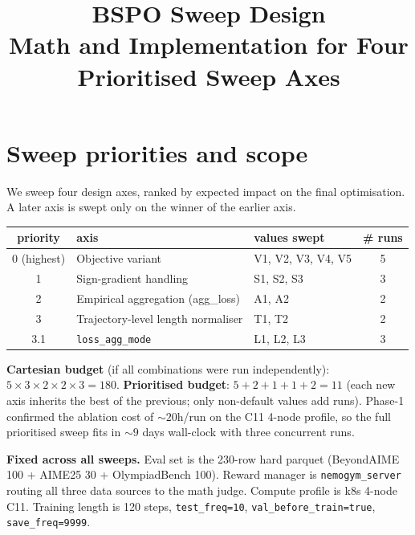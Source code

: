 \documentclass[11pt]{article}
\title{BSPO Sweep Design \\
\large Math and Implementation for Four Prioritised Sweep Axes}
\author{}
\date{}
\begin{document}
\maketitle

\section{Sweep priorities and scope}

We sweep four design axes, ranked by expected impact on the final
optimisation. A later axis is swept only on the winner of the earlier
axis.

\begin{center}
\renewcommand{\arraystretch}{1.35}
\begin{tabular}{c l l c}
\toprule
priority & axis & values swept & \# runs \\
\midrule
0 (highest) & Objective variant                         & V1, V2, V3, V4, V5 & 5 \\
1           & Sign-gradient handling                    & S1, S2, S3         & 3 \\
2           & Empirical aggregation (agg\_loss)         & A1, A2             & 2 \\
3           & Trajectory-level length normaliser        & T1, T2             & 2 \\
3.1         & \texttt{loss\_agg\_mode}                  & L1, L2, L3         & 3 \\
\bottomrule
\end{tabular}
\end{center}

\textbf{Cartesian budget} (if all combinations were run independently):
$5 \times 3 \times 2 \times 2 \times 3 = 180$. \textbf{Prioritised budget}:
$5 + 2 + 1 + 1 + 2 = 11$ (each new axis inherits the best of the
previous; only non-default values add runs). Phase-1 confirmed the
ablation cost of $\sim 20$h/run on the C11 4-node profile, so the full
prioritised sweep fits in $\sim 9$ days wall-clock with three concurrent
runs.

\textbf{Fixed across all sweeps.} Eval set is the 230-row hard parquet
(BeyondAIME 100 + AIME25 30 + OlympiadBench 100). Reward manager is
\verb|nemogym_server| routing all three data sources to the math judge.
Compute profile is k8s 4-node C11. Training length is 120 steps,
\verb|test_freq=10|, \verb|val_before_train=true|,
\verb|save_freq=9999|.
\end{document}
